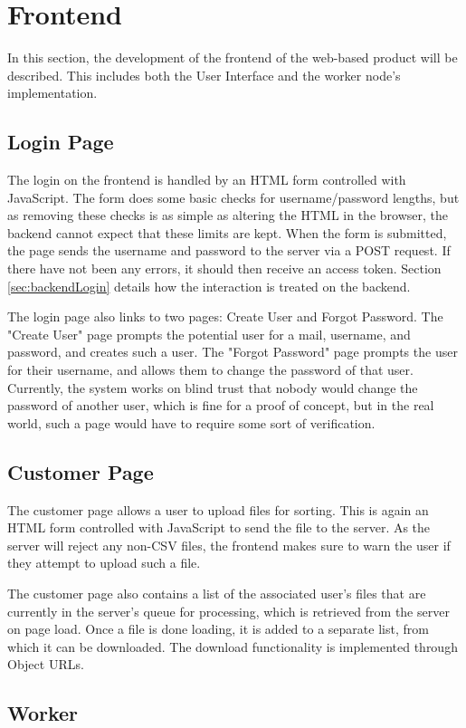 \section{Frontend}
In this section, the development of the frontend of the web-based product will be described. This includes both the User Interface and the worker node's implementation.

\subsection{Login Page}
The login on the frontend is handled by an HTML form controlled with JavaScript. The form does some basic checks for username/password lengths, but as removing these checks is as simple as altering the HTML in the browser, the backend cannot expect that these limits are kept. When the form is submitted, the page sends the username and password to the server via a POST request. If there have not been any errors, it should then receive an access token. Section \ref{sec:backendLogin} details how the interaction is treated on the backend.

The login page also links to two pages: Create User and Forgot Password. The "Create User" page prompts the potential user for a mail, username, and password, and creates such a user. The "Forgot Password" page prompts the user for their username, and allows them to change the password of that user. Currently, the system works on blind trust that nobody would change the password of another user, which is fine for a proof of concept, but in the real world, such a page would have to require some sort of verification.


\subsection{Customer Page}
The customer page allows a user to upload files for sorting. This is again an HTML form controlled with JavaScript to send the file to the server. As the server will reject any non-CSV files, the frontend makes sure to warn the user if they attempt to upload such a file.

The customer page also contains a list of the associated user's files that are currently in the server's queue for processing, which is retrieved from the server on page load. Once a file is done loading, it is added to a separate list, from which it can be downloaded. The download functionality is implemented through Object URLs.

\subsection{Worker}

